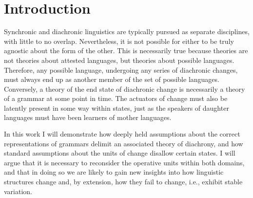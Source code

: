 \chapter{Introduction}\label{ch:1}

Synchronic and diachronic linguistics are typically pursued as separate
disciplines, with little to no overlap. Nevertheless, it is not possible
for either to be truly agnostic about the form of the other. This
is necessarily true because  theories are not theories about
attested languages, but theories about possible languages. Therefore,
any possible language, undergoing any series of diachronic changes,
must always end up as another member of the set of possible 
languages. Conversely, a theory of the end state of diachronic change
is necessarily a theory of a  grammar at some point in time.
The actuators of change must also be latently present in some way
within  states, just as the speakers of daughter languages
must have been learners of mother languages.

In this work I will demonstrate how deeply held assumptions about
the correct representations of  grammars delimit an associated
theory of diachrony, and how standard assumptions about the units
of change disallow certain  states. I will argue that it
is necessary to reconsider the operative units within both domains,
and that in doing so we are likely to gain new insights into how linguistic
structures change and, by extension, how they fail to change, i.e.,
exhibit stable variation.

